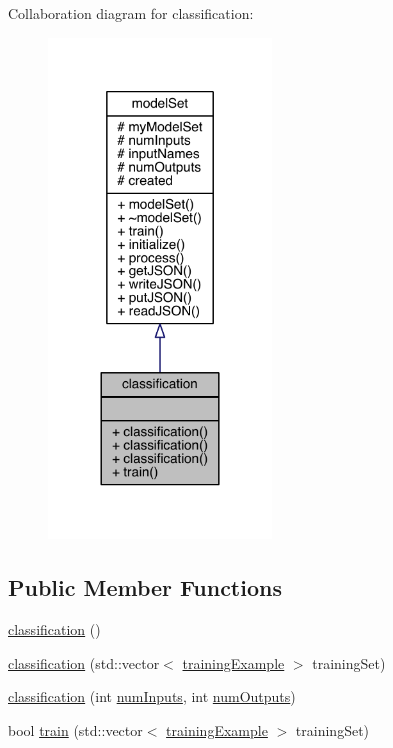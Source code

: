 Collaboration diagram for classification\+:\nopagebreak
\begin{figure}[H]
\begin{center}
\leavevmode
\includegraphics[width=168pt]{classclassification__coll__graph}
\end{center}
\end{figure}
\subsection*{Public Member Functions}
\begin{DoxyCompactItemize}
\item 
\hyperlink{classclassification_a96cfefed3bbc9b8b61a44b9c6cc9e29a}{classification} ()
\item 
\hyperlink{classclassification_a825ef0d6ba9ba826d22969be72a9011f}{classification} (std\+::vector$<$ \hyperlink{structtraining_example}{training\+Example} $>$ training\+Set)
\item 
\hyperlink{classclassification_ab76d1e8c617be54ede9ea47dd3c128bf}{classification} (int \hyperlink{classmodel_set_ad10fbc1228a85f1200cb89589ad92755}{num\+Inputs}, int \hyperlink{classmodel_set_addc0df56b9f1970c9816050634933716}{num\+Outputs})
\item 
bool \hyperlink{classclassification_a8e834c25309bc471c5bb8e8730874c82}{train} (std\+::vector$<$ \hyperlink{structtraining_example}{training\+Example} $>$ training\+Set)
\end{DoxyCompactItemize}
